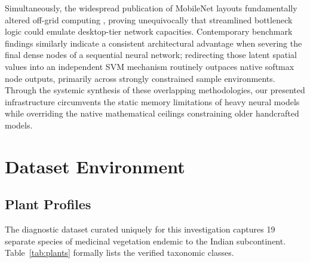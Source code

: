 \documentclass[conference]{IEEEtran}
\begin{document}
Simultaneously, the widespread publication of MobileNet layouts fundamentally altered off-grid computing \cite{howard2018}, proving unequivocally that streamlined bottleneck logic could emulate desktop-tier network capacities. Contemporary benchmark findings \cite{saleem2022} similarly indicate a consistent architectural advantage when severing the final dense nodes of a sequential neural network; redirecting those latent spatial values into an independent SVM mechanism routinely outpaces native softmax node outputs, primarily across strongly constrained sample environments. Through the systemic synthesis of these overlapping methodologies, our presented infrastructure circumvents the static memory limitations of heavy neural models while overriding the native mathematical ceilings constraining older handcrafted models.

\section{Dataset Environment}

\subsection{Plant Profiles}
The diagnostic dataset curated uniquely for this investigation captures 19 separate species of medicinal vegetation endemic to the Indian subcontinent. Table~\ref{tab:plants} formally lists the verified taxonomic classes.
\end{document}
